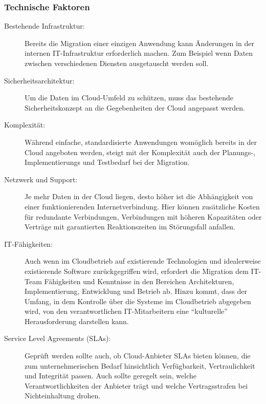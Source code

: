 \subsubsection{Technische Faktoren}
\begin{description}
	\item[Bestehende Infrastruktur:] Bereits die Migration einer
einzigen Anwendung kann Änderungen in der internen IT-Infrastruktur
erforderlich machen. Zum Beispiel wenn Daten zwischen verschiedenen Diensten
ausgetauscht werden soll.

	\item[Sicherheitsarchitektur:] Um die Daten im Cloud-Umfeld zu
schützen, muss das bestehende Sicherheitskonzept an die Gegebenheiten der Cloud
angepasst werden.

	\item[Komplexität:]
	Während einfache, standardisierte Anwendungen womöglich bereits in der
Cloud angeboten werden, steigt mit der Komplexität auch der Planungs-,
Implementierungs und Testbedarf bei der Migration.

	\item[Netzwerk und Support:] Je mehr Daten in der Cloud liegen, desto
höher ist die Abhängigkeit von einer funktionierenden Internetverbindung. Hier
können zusätzliche Kosten für redundante Verbindungen, Verbindungen mit höheren
Kapazitäten oder Verträge mit garantierten Reaktionszeiten im Störungsfall
anfallen.

	\item[IT-Fähigkeiten:] Auch wenn im Cloudbetrieb auf existierende
Technologien und idealerweise existierende Software zurückgegriffen wird,
erfordert die Migration dem IT-Team Fähigkeiten und Kenntnisse in den Bereichen
Architekturen, Implementierung, Entwicklung und Betrieb ab. Hinzu kommt, dass
der Umfang, in dem Kontrolle über die Systeme im Cloudbetrieb abgegeben wird,
von den verantwortlichen IT-Mitarbeitern eine "`kulturelle"' Herausforderung
darstellen kann.

	\item[Service Level Agreements (SLAs):] Geprüft werden sollte auch, ob
Cloud-Anbieter SLAs bieten können, die zum unternehmerischen Bedarf
hinsichtlich Verfügbarkeit, Vertraulichkeit und Integrität passen. Auch sollte
geregelt sein, welche Verantwortlichkeiten der Anbieter trägt und welche
Vertragsstrafen bei Nichteinhaltung drohen.
\end{description}


